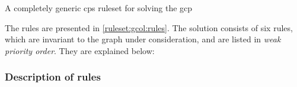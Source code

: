 \begin{cprulesetfloat}
\begin{cpruleset}

    
    
    
    
    

\end{cpruleset}
\caption[\gls{cps} rules for the ]{\label{ruleset:gcol:rules}A completely generic \gls{cps} ruleset for solving the \gls{gcp}}
\end{cprulesetfloat}

The rules are presented in \cref{ruleset:gcol:rules}.  The solution consists of six rules, which are invariant to the graph under consideration, and are listed in \emph{weak priority order}.  They are explained below:

\subsubsection{Description of rules}

